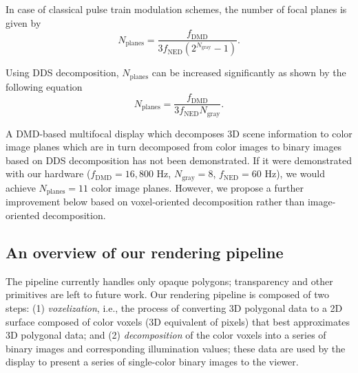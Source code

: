 In case of classical pulse train modulation schemes, the number of focal planes is given by
\begin{equation}
N_{\text{planes}} = \frac{f_{\text{DMD}}}{3 f_{\text{NED}} (2^{N_{\text{gray}}}-1)}.
\end{equation}

Using DDS decomposition, $N_{\text{planes}}$ can be increased significantly as shown by the following equation
\begin{equation}
N_{\text{planes}} = \frac{f_{\text{DMD}}}{3 f_{\text{NED}} N_{\text{gray}}}.
\end{equation}

A DMD-based multifocal display which decomposes 3D scene information to color image planes which are in turn decomposed from color images to binary images based on DDS decomposition has not been demonstrated. If it were demonstrated with our hardware ($f_{\text{DMD}} = 16,800$ Hz, $N_{\text{gray}}=8$, $f_{\text{NED}}=60$ Hz), we would achieve $N_{\text{planes}}=11$ color image planes. However, we propose a further improvement below based on voxel-oriented decomposition rather than image-oriented decomposition. 



\subsection{An overview of our rendering pipeline}
The pipeline currently handles only opaque polygons; transparency and other primitives are left to future work. Our rendering pipeline is composed of two steps: (1)  \emph{voxelization}, i.e., the process of converting 3D polygonal data to a 2D surface composed of color voxels (3D equivalent of pixels) that best approximates 3D polygonal data; and (2) \emph{decomposition} of the color voxels into a series of binary images and corresponding illumination values; these data are used by the display to present a series of single-color binary images to the viewer. 

